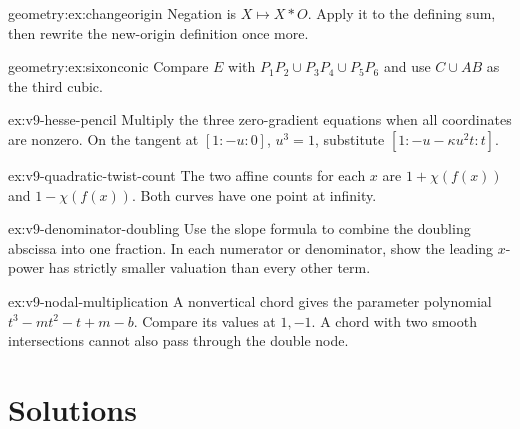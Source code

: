\begin{hint}{geometry:ex:changeorigin}
Negation is $X\mapsto X*O$. Apply it to the defining sum, then rewrite the new-origin definition once more.
\end{hint}
\begin{hint}{geometry:ex:sixonconic}
Compare $E$ with $P_1P_2\cup P_3P_4\cup P_5P_6$ and use $C\cup AB$ as the third cubic.
\end{hint}
\begin{hint}{ex:v9-hesse-pencil}
Multiply the three zero-gradient equations when all coordinates are nonzero. On the tangent at $[1:-u:0]$, $u^3=1$, substitute $[1:-u-\kappa u^2t:t]$.
\end{hint}
\begin{hint}{ex:v9-quadratic-twist-count}
The two affine counts for each $x$ are $1+\chi(f(x))$ and $1-\chi(f(x))$. Both curves have one point at infinity.
\end{hint}
\begin{hint}{ex:v9-denominator-doubling}
Use the slope formula to combine the doubling abscissa into one fraction. In each numerator or denominator, show the leading $x$-power has strictly smaller valuation than every other term.
\end{hint}
\begin{hint}{ex:v9-nodal-multiplication}
A nonvertical chord gives the parameter polynomial $t^3-mt^2-t+m-b$. Compare its values at $1,-1$. A chord with two smooth intersections cannot also pass through the double node.
\end{hint}

\section{Solutions}

